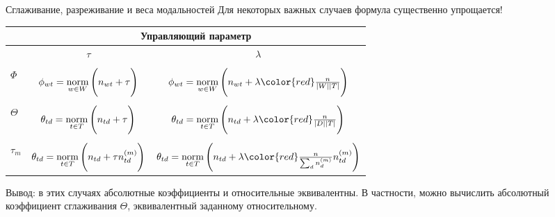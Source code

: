 \begin{frame}{Сглаживание, разреживание и веса модальностей}
Для некоторых важных случаев формула существенно упрощается!

\begin{table}[]
\begin{tabular}{l|c|c|}
         & \multicolumn{2}{c}{Управляющий параметр}                                                                                                      \\ \hline
         & $\tau$                                          & $\lambda$                                                                                   \\ \hline 
         &    &          \\[-5pt]
$\Phi$   & $\phi_{wt} = \mathop{\mathrm{norm}}\limits_{w \in W}\Bigg(n_{wt} + \tau\Bigg)$    & $\phi_{wt} = \norm_{w \in W}\Bigg(n_{wt} + \lambda {\color{red}\frac{n}{|W||T|}}\Bigg)$    \\[15pt] \hline
         &    &          \\[-5pt]
$\Theta$ & $\theta_{td} = \mathop{\mathrm{norm}}\limits_{t \in T} \Bigg(n_{td} + \tau\Bigg)$ & $\theta_{td} = \norm_{t \in T} \Bigg(n_{td} + \lambda {\color{red}\frac{n}{|D| |T|}}\Bigg)$ \\[15pt]  \hline
         &    &          \\[-5pt]
$\tau_m$ & $\theta_{td} = \mathop{\mathrm{norm}}\limits_{t \in T} \Bigg(n_{td} + \tau n_{td}^{(m)}\Bigg)$ & $\theta_{td} = \norm_{t \in T} \Bigg(n_{td} + \lambda  {
    \color{red}\frac{n}{\sum_d n_d^{(m)}}
    } n_{td}^{(m)}\Bigg)$ \\[15pt]  \hline
\end{tabular}
\end{table}
Вывод: в этих случаях абсолютные коэффициенты и относительные эквивалентны. В частности, можно вычислить абсолютный коэффициент сглаживания $\Theta$, эквивалентный заданному относительному.
\end{frame}




